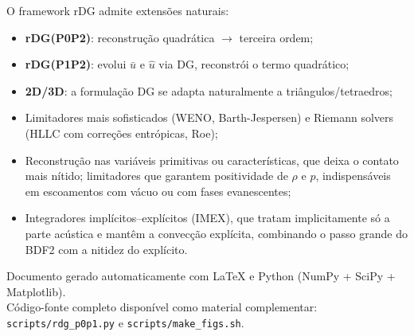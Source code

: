 \documentclass[10pt,a4paper]{article}
\newcommand{\ub}{\bar u}
\newcommand{\uh}{\hat u}
\begin{document}
O framework rDG admite extensões naturais:
\begin{itemize}[leftmargin=2.5em,itemsep=3pt]
\item \textbf{rDG(P0P2)}: reconstrução quadrática $\to$ terceira ordem;
\item \textbf{rDG(P1P2)}: evolui $\ub$ e $\uh$ via DG, reconstrói o termo quadrático;
\item \textbf{2D/3D}: a formulação DG se adapta naturalmente a triângulos/tetraedros;
\item Limitadores mais sofisticados (WENO, Barth-Jespersen) e Riemann solvers (HLLC com correções entrópicas, Roe);
\item Reconstrução nas variáveis primitivas ou características, que deixa o contato mais nítido; limitadores que garantem positividade de $\rho$ e $p$, indispensáveis em escoamentos com vácuo ou com fases evanescentes;
\item Integradores implícitos--explícitos (IMEX), que tratam implicitamente só a parte acústica e mantêm a convecção explícita, combinando o passo grande do BDF2 com a nitidez do explícito.
\end{itemize}

\vfill
\begin{center}\small\color{cinzatexto}
Documento gerado automaticamente com \LaTeX{} e Python (NumPy + SciPy + Matplotlib).\\
Código-fonte completo disponível como material complementar: \texttt{scripts/rdg\_p0p1.py} e \texttt{scripts/make\_figs.sh}.
\end{center}
\end{document}
